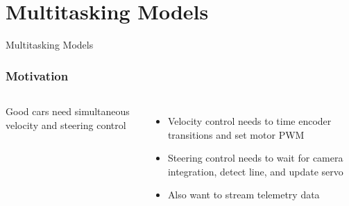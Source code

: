 \documentclass{beamer}
\begin{document}
\begin{frame}
\titlepage

\setcounter{tocdepth}{1}
\tableofcontents
\end{frame}


\section{Multitasking Models} %
\begin{frame}
\centering \huge Multitasking Models
\end{frame}

\begin{frame}
\frametitle{Motivation}
\begin{columns}[t]
Good cars need simultaneous velocity and steering control
\begin{itemize}
  \item Velocity control needs to time encoder transitions and set motor PWM
  \item Steering control needs to wait for camera integration, detect line, and update servo
  \item Also want to stream telemetry data
\end{itemize}

\end{columns}
\end{frame}

\end{document}
